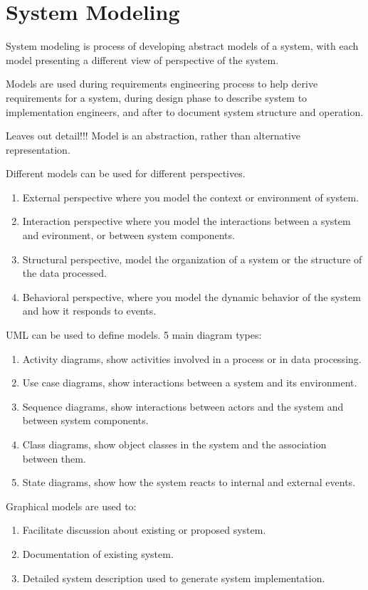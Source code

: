 \documentclass{article}
\begin{document}
 
\setcounter{section}{4}
\section{System Modeling}
System modeling is process of developing abstract models of a system, with each model presenting a different view of perspective of the system.

Models are used during requirements engineering process to help derive requirements for a system, during design phase to describe system to implementation engineers, and after to document system structure and operation.

Leaves out detail!!!  Model is an abstraction, rather than alternative representation.

Different models can be used for different perspectives.  
\begin{enumerate}
    \item External perspective where you model the context or environment of system.
    \item Interaction perspective where you model the interactions between a system and evironment, or between system components.
    \item Structural perspective, model the organization of a system or the structure of the data processed.
    \item Behavioral perspective, where you model the dynamic behavior of the system and how it responds to events.
\end{enumerate}

UML can be used to define models.  5 main diagram types:
\begin{enumerate}
    \item Activity diagrams, show activities involved in a process or in data processing.
    \item Use case diagrams, show interactions between a system and its environment.
    \item Sequence diagrams, show interactions between actors and the system and between system components.
    \item Class diagrams, show object classes in the system and the association between them.
    \item State diagrams, show how the system reacts to internal and external events.
\end{enumerate}

Graphical models are used to:

\begin{enumerate}
    \item Facilitate discussion about existing or proposed system.
    \item Documentation of existing system.
    \item Detailed system description used to generate system implementation.
\end{enumerate}
\end{document}
